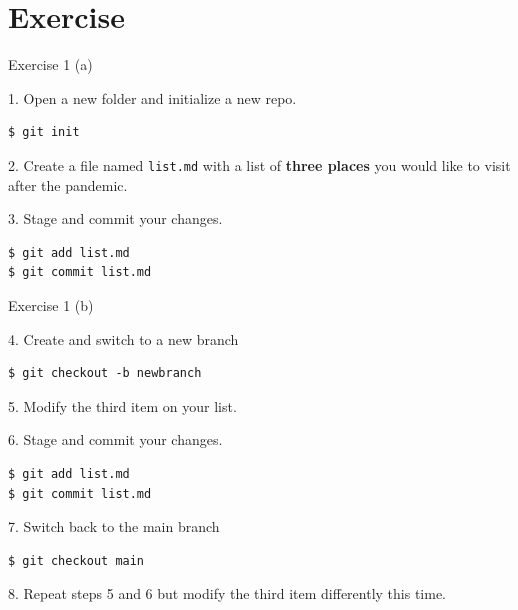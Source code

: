 \documentclass[handout]{beamer}
\begin{document}
\section{Exercise}

\begin{frame}[fragile]{Exercise 1 (a)}

1. Open a new folder and initialize a new repo.
\begin{lstlisting}
$ git init 
\end{lstlisting}
2. Create a file named \texttt{list.md} with a list of \textbf{three places} you would like to visit after the pandemic.

\vspace{0.3cm}

3. Stage and commit your changes.

\begin{lstlisting}
$ git add list.md
$ git commit list.md
\end{lstlisting}

\end{frame}

\begin{frame}[fragile]{Exercise 1 (b)}

4. Create and switch to a new branch
\begin{lstlisting}
$ git checkout -b newbranch
\end{lstlisting}

5. Modify the third item on your list.

\vspace{0.3cm}

6. Stage and commit your changes.

\begin{lstlisting}
$ git add list.md
$ git commit list.md
\end{lstlisting}

7. Switch back to the main branch
\begin{lstlisting}
$ git checkout main
\end{lstlisting}

8. Repeat steps 5 and 6 but modify the third item differently this time. 

\end{frame}
\end{document}
